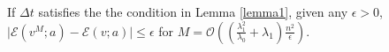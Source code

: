 \begin{thm}
	\label{theorem:one}
	If $\Delta t$ satisfies the the condition in Lemma \ref{lemma1}, given any $\epsilon > 0$, $\vert \mathcal{E}(v^M;a) - \mathcal{E}(v;a)\vert \leq \epsilon$ for $M = \mathcal{O}((\frac{\lambda_{1}^2}{\lambda_{0}} + \lambda_{1}) \frac{n^2}{\epsilon})$.

\end{thm}
